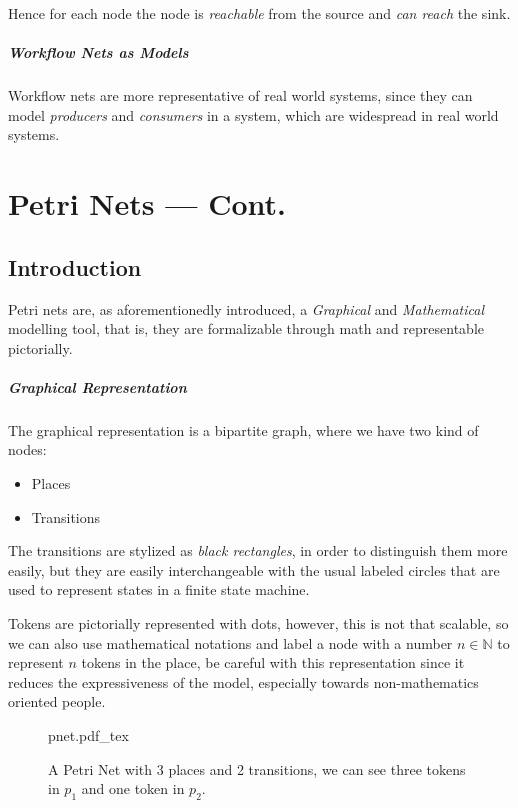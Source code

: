 \documentclass[openright, twoside, twocolumn, a4paper, 10pt]{report}
\newcommand{\incsvg}[2]{%
	\def\svgwidth{\columnwidth}
	{#2.pdf_tex}%
}
\begin{document}
Hence for each node the node is \emph{reachable} from the source and \emph{can reach} the sink.

\paragraph{Workflow Nets as Models}
Workflow nets are more representative of real world systems, since they can model \emph{producers} and
\emph{consumers} in a system, which are widespread in real world systems.



\chapter{Petri Nets --- Cont.}\label{chap:petri}
\section{Introduction}
Petri nets are, as aforementionedly introduced, a \emph{Graphical} and \emph{Mathematical} modelling tool,
that is, they are formalizable through math and representable pictorially.

\paragraph{Graphical Representation}

The graphical representation is a bipartite graph, where we have two kind of nodes:

\begin{itemize}
	\item Places
	\item Transitions
\end{itemize}

The transitions are stylized as \emph{black rectangles}, in order to distinguish them more easily, but they are easily interchangeable
with the usual labeled circles that are used to represent states in a finite state machine.

Tokens are pictorially represented with dots, however, this is not that scalable, so we can also use mathematical
notations and label a node with a number $n \in \mathbb{N}$ to represent $n$ tokens in the place, be careful with
this representation since it reduces the expressiveness of the model, especially towards non-mathematics oriented
people.

\begin{figure}[ht]
	\centering
	\incsvg{fig}{pnet}\\\label{fig:pnet}
	\caption{%
		A Petri Net with 3 places and 2 transitions, we can
		see three tokens in $p_1$ and one token in $p_2$.
	}
\end{figure}
\end{document}
